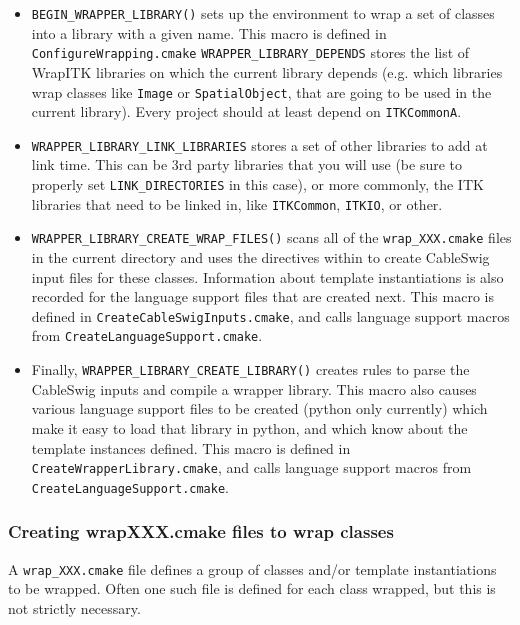 \documentclass{InsightArticle}
\begin{document}
\begin{itemize}
  \item \verb$BEGIN_WRAPPER_LIBRARY()$ sets up the environment to wrap a set of classes into a
library with a given name. This macro is defined in \verb$ConfigureWrapping.cmake$
\verb$WRAPPER_LIBRARY_DEPENDS$ stores the list of WrapITK libraries on which the
current library depends (e.g. which libraries wrap classes like \verb$Image$ or
\verb$SpatialObject$, that are going to be used in the current library). Every project
should at least depend on \verb$ITKCommonA$.

  \item \verb$WRAPPER_LIBRARY_LINK_LIBRARIES$ stores a set of other libraries to add at link
time. This can be 3rd party libraries that you will use (be sure to properly set
\verb$LINK_DIRECTORIES$ in this case), or more commonly, the ITK libraries that need to
be linked in, like \verb$ITKCommon$, \verb$ITKIO$, or other. 

  \item \verb$WRAPPER_LIBRARY_CREATE_WRAP_FILES()$ scans all of the \verb$wrap_XXX.cmake$ files in the
current directory and uses the directives within to create CableSwig input files
for these classes. Information about template instantiations is also recorded
for the language support files that are created next. This macro is defined in
\verb$CreateCableSwigInputs.cmake$, and calls language support macros from
\verb$CreateLanguageSupport.cmake$.

  \item Finally, \verb$WRAPPER_LIBRARY_CREATE_LIBRARY()$ creates rules to parse the CableSwig
inputs and compile a wrapper library. This macro also causes various language
support files to be created (python only currently) which make it easy to load
that library in python, and which know about the template instances defined.
This macro is defined in \verb$CreateWrapperLibrary.cmake$, and calls language support
macros from \verb$CreateLanguageSupport.cmake$.
\end{itemize}


     \subsubsection{Creating wrapXXX.cmake files to wrap classes}

A \verb$wrap_XXX.cmake$ file defines a group of classes and/or template instantiations
to be wrapped. Often one such file is defined for each class wrapped, but this
is not strictly necessary.
\end{document}
